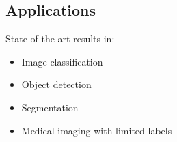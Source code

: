 \subsection{Applications}

State-of-the-art results in:
\begin{itemize}
    \item Image classification
    \item Object detection
    \item Segmentation
    \item Medical imaging with limited labels
\end{itemize}





